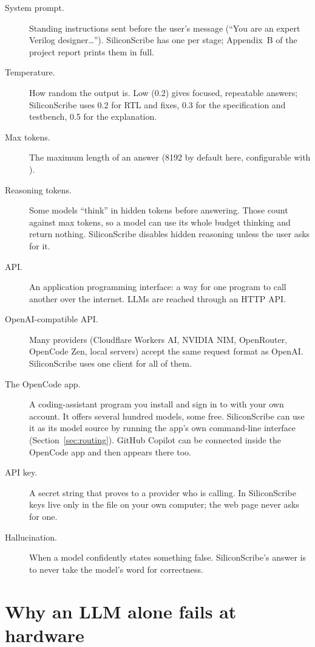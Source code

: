\begin{description}
  \item[System prompt.] Standing instructions sent before the user's message (``You are an expert Verilog designer\ldots''). SiliconScribe has one per stage; Appendix~B of the project report prints them in full.
  \item[Temperature.] How random the output is. Low (0.2) gives focused, repeatable answers; SiliconScribe uses 0.2 for RTL and fixes, 0.3 for the specification and testbench, 0.5 for the explanation.
  \item[Max tokens.] The maximum length of an answer (8192 by default here, configurable with ).
  \item[Reasoning tokens.] Some models ``think'' in hidden tokens before answering. Those count against max tokens, so a model can use its whole budget thinking and return nothing. SiliconScribe disables hidden reasoning unless the user asks for it.
  \item[API.] An application programming interface: a way for one program to call another over the internet. LLMs are reached through an HTTP API.
  \item[OpenAI-compatible API.] Many providers (Cloudflare Workers AI, NVIDIA NIM, OpenRouter, OpenCode Zen, local servers) accept the same request format as OpenAI. SiliconScribe uses one client for all of them.
  \item[The OpenCode app.] A coding-assistant program you install and sign in to with your own account. It offers several hundred models, some free. SiliconScribe can use it as its model source by running the app's own command-line interface (Section~\ref{sec:routing}). GitHub Copilot can be connected inside the OpenCode app and then appears there too.
  \item[API key.] A secret string that proves to a provider who is calling. In SiliconScribe keys live only in the file  on your own computer; the web page never asks for one.
  \item[Hallucination.] When a model confidently states something false. SiliconScribe's answer is to never take the model's word for correctness.
\end{description}

\section{Why an LLM alone fails at hardware}
\label{sec:llmalonefails}

